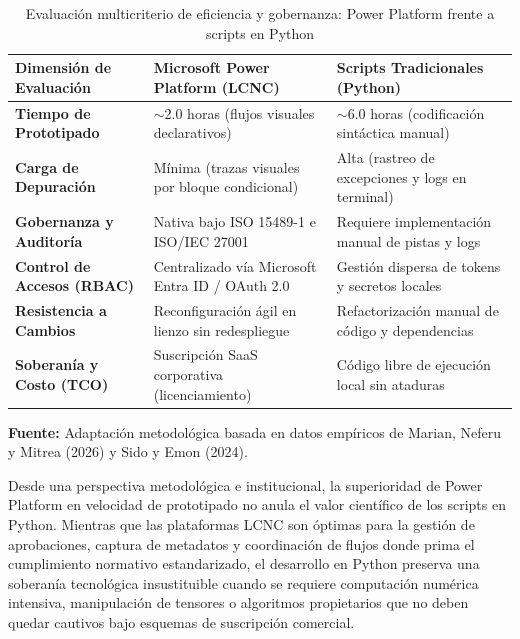 \begin{table}[htpb!]
    \centering
    \small
    \renewcommand{\arraystretch}{1.3}
    \caption{Evaluación multicriterio de eficiencia y gobernanza: Power Platform frente a scripts en Python}
    \label{tab:lcnc_vs_python}
    \begin{tabularx}{\textwidth}{>{\raggedright\arraybackslash\bfseries}p{3.2cm} >{\raggedright\arraybackslash}X >{\raggedright\arraybackslash}X}
    \toprule
    Dimensión de Evaluación & \textbf{Microsoft Power Platform (LCNC)} & \textbf{Scripts Tradicionales (Python)} \\
    \midrule
    Tiempo de Prototipado & $\sim$2.0 horas (flujos visuales declarativos) & $\sim$6.0 horas (codificación sintáctica manual) \\
    Carga de Depuración & Mínima (trazas visuales por bloque condicional) & Alta (rastreo de excepciones y logs en terminal) \\
    Gobernanza y Auditoría & Nativa bajo ISO 15489-1 e ISO/IEC 27001 & Requiere implementación manual de pistas y logs \\
    Control de Accesos (RBAC) & Centralizado vía Microsoft Entra ID / OAuth 2.0 & Gestión dispersa de tokens y secretos locales \\
    Resistencia a Cambios & Reconfiguración ágil en lienzo sin redespliegue & Refactorización manual de código y dependencias \\
    Soberanía y Costo (TCO) & Suscripción SaaS corporativa (licenciamiento) & Código libre de ejecución local sin ataduras \\
    \bottomrule
    \end{tabularx}
    \vspace{0.1cm}
    {\raggedright \scriptsize \textbf{Fuente:} Adaptación metodológica basada en datos empíricos de Marian, Neferu y Mitrea (2026) y Sido y Emon (2024).\par}
\end{table}

Desde una perspectiva metodológica e institucional, la superioridad de Power Platform en velocidad de prototipado no anula el valor científico de los scripts en Python. Mientras que las plataformas LCNC son óptimas para la gestión de aprobaciones, captura de metadatos y coordinación de flujos donde prima el cumplimiento normativo estandarizado, el desarrollo en Python preserva una soberanía tecnológica insustituible cuando se requiere computación numérica intensiva, manipulación de tensores o algoritmos propietarios que no deben quedar cautivos bajo esquemas de suscripción comercial.

